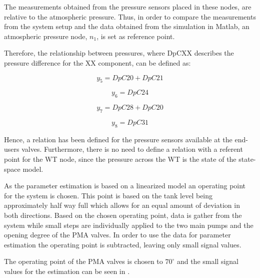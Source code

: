 The measurements obtained from the pressure sensors placed in these nodes, are relative to the atmospheric pressure. Thus, in order to compare the measurements
from the system setup and the data obtained from the simulation in Matlab, an atmospheric pressure node, $n_1$, is set as reference point.

Therefore, the relationship between pressures, where DpCXX describes the pressure difference for the XX component, can be defined as:

\vspace{4mm}
\begin {equation}
     y_5 = DpC20 + DpC21  
\end{equation}

\vspace{4mm}
\begin {equation}
     y_6 = DpC24
\end{equation}


\vspace{4mm}
\begin {equation}
     y_7 = DpC28 + DpC20 
\end{equation}

\vspace{4mm}
\begin {equation}
     y_8 = DpC31 
\end{equation}

Hence, a relation has been defined for the pressure sensors available at the end-users valves. Furthermore, there is no need to define a relation with a referent point 
for the WT node, since the pressure across the WT is the state of the state-space model. 


As the parameter estimation is based on a linearized model an operating point for the system is chosen. This point is based on the tank level being approximately half way full which allows for an equal amount of deviation in both directions. Based on the chosen operating point, data is gather from the system while small steps are individually applied to the two main pumps and the opening degree of the PMA valves. In order to use the data for parameter estimation the operating point is subtracted, leaving only small signal values.  

The operating point of the PMA valves is chosen to $70^{\circ}$ and the small signal values for the estimation can be seen in .

